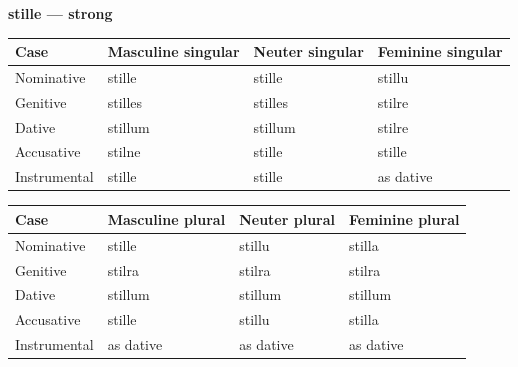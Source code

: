 \textbf{stille — strong}

\par\begingroup
\fontsize{10.5}{13.2}\selectfont
\setlength{\LTleft}{0pt}\setlength{\LTright}{\fill}
\noindent
\begin{tabular}{@{}>{\raggedright\arraybackslash}p{22.0mm}>{\raggedright\arraybackslash}p{31.188mm}>{\raggedright\arraybackslash}p{31.188mm}>{\raggedright\arraybackslash}p{31.188mm}@{}}
\toprule
\textbf{Case} & \textbf{Masculine singular} & \textbf{Neuter singular} & \textbf{Feminine singular} \\
\midrule
Nominative & stille & stille & stillu \\
Genitive & stilles & stilles & stilre \\
Dative & stillum & stillum & stilre \\
Accusative & stilne & stille & stille \\
Instrumental & stille & stille & as dative \\
\bottomrule
\end{tabular}
\par\endgroup
\par\addvspace{5pt}
\par\begingroup
\fontsize{10.5}{13.2}\selectfont
\setlength{\LTleft}{0pt}\setlength{\LTright}{\fill}
\noindent
\begin{tabular}{@{}>{\raggedright\arraybackslash}p{22.0mm}>{\raggedright\arraybackslash}p{31.188mm}>{\raggedright\arraybackslash}p{31.188mm}>{\raggedright\arraybackslash}p{31.188mm}@{}}
\toprule
\textbf{Case} & \textbf{Masculine plural} & \textbf{Neuter plural} & \textbf{Feminine plural} \\
\midrule
Nominative & stille & stillu & stilla \\
Genitive & stilra & stilra & stilra \\
Dative & stillum & stillum & stillum \\
Accusative & stille & stillu & stilla \\
Instrumental & as dative & as dative & as dative \\
\bottomrule
\end{tabular}
\par\endgroup

